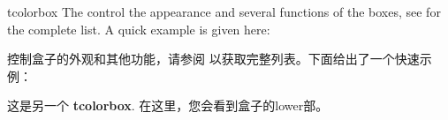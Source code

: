 \begin{docEnvironment}{tcolorbox}{}
The  control the appearance and several functions of the boxes,
see  for the complete list.
A quick example is given here:

{}控制盒子的外观和其他功能，请参阅  以获取完整列表。下面给出了一个快速示例：

\begin{dispExample}
\begin{tcolorbox}[colback=red!5!white,colframe=red!75!black,title=My nice heading]
  这是另一个 \textbf{tcolorbox}.
\tcblower
在这里，您会看到盒子的lower部。
\end{tcolorbox}
\end{dispExample}
\end{docEnvironment}
